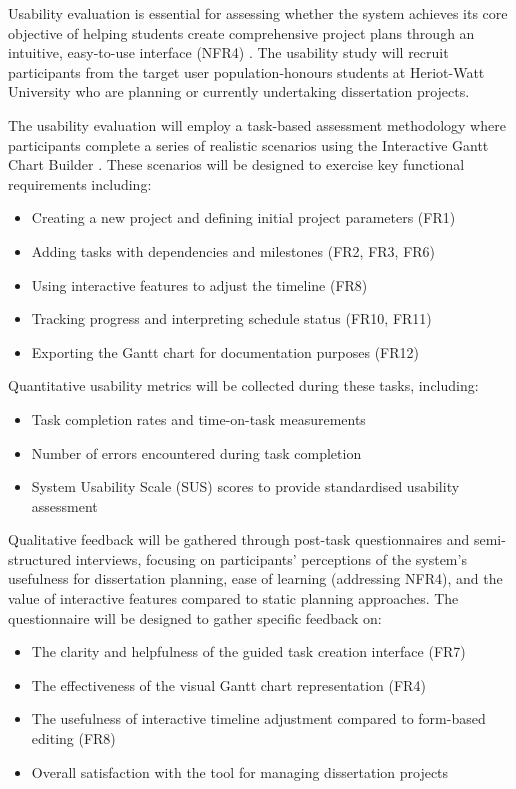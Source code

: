 \documentclass[12pt,nonacm,acmlarge,titlepage,screen]{acmart}
\begin{document}
Usability evaluation is essential for assessing whether the system achieves its core objective of helping students create comprehensive project plans through an intuitive, easy-to-use interface (NFR4) \cite{Vlachogianni_2023}. The usability study will recruit participants from the target user population-honours students at Heriot-Watt University who are planning or currently undertaking dissertation projects.

The usability evaluation will employ a task-based assessment methodology where participants complete a series of realistic scenarios using the Interactive Gantt Chart Builder \cite{humayoun_2012}. These scenarios will be designed to exercise key functional requirements including:
\begin{itemize}
    \item Creating a new project and defining initial project parameters (FR1)
    \item Adding tasks with dependencies and milestones (FR2, FR3, FR6)
    \item Using interactive features to adjust the timeline (FR8)
    \item Tracking progress and interpreting schedule status (FR10, FR11)
    \item Exporting the Gantt chart for documentation purposes (FR12)
\end{itemize}

Quantitative usability metrics will be collected during these tasks, including:
\begin{itemize}
    \item Task completion rates and time-on-task measurements
    \item Number of errors encountered during task completion
    \item System Usability Scale (SUS) scores to provide standardised usability assessment \cite{brooke_1995}
\end{itemize}

Qualitative feedback will be gathered through post-task questionnaires and semi-structured interviews, focusing on participants' perceptions of the system's usefulness for dissertation planning, ease of learning (addressing NFR4), and the value of interactive features compared to static planning approaches. The questionnaire will be designed to gather specific feedback on:
\begin{itemize}
    \item The clarity and helpfulness of the guided task creation interface (FR7)
    \item The effectiveness of the visual Gantt chart representation (FR4)
    \item The usefulness of interactive timeline adjustment compared to form-based editing (FR8)
    \item Overall satisfaction with the tool for managing dissertation projects
\end{itemize}
\end{document}
